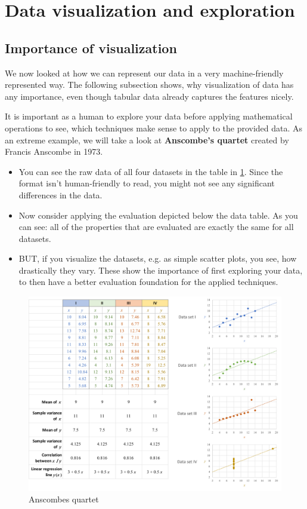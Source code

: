 \section{Data visualization and exploration}
\setcounter{figure}{0}



\subsection*{Importance of visualization}
We now looked at how we can represent our data in a very machine-friendly represented way. The following subsection shows, why visualization of data has any importance, even though tabular data already captures the features nicely.

It is important as a human to explore your data before applying mathematical operations to see, which techniques make sense to apply to the provided data. As an extreme example, we will take a look at \textbf{Anscombe's quartet} created by Francis Anscombe in 1973. 
\begin{itemize}
  \item You can see the raw data of all four datasets in the table in \ref{fig:2_anscombes_quartet}. Since the format isn't human-friendly to read, you might not see any significant differences in the data.
  \item Now consider applying the evaluation depicted below the data table. As you can see: all of the properties that are evaluated are exactly the same for all datasets.
  \item BUT, if you visualize the datasets, e.g. as simple scatter plots, you see, how drastically they vary. These show the importance of first exploring your data, to then have a better evaluation foundation for the applied techniques.
\end{itemize} 

\begin{figure}[H]
  \centering
  \includegraphics[width=\textwidth]{assets/visualization_and_extraction/anscombes_quartet.png}
  \caption{Anscombes quartet}
  \label{fig:2_anscombes_quartet}
\end{figure}

